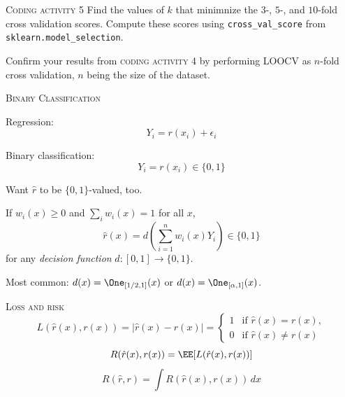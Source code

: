 \documentclass{beamer}
\begin{document}
\begin{frame}{\textsc{Coding activity 5}}
    Find the values of $k$ that minimnize the $3$-, $5$-, and $10$-fold cross validation scores.
    Compute these scores using \texttt{cross\_val\_score} from \texttt{sklearn.model\_selection}.
    
    Confirm your results from \textsc{coding activity 4} by performing LOOCV as 
    $n$-fold cross validation, $n$ being the size of the dataset.
\end{frame}

\begin{frame}{\textsc{Binary Classification}}
    
    Regression:
    \[
        Y_i = r(x_i) + \epsilon_i
    \]
    
    Binary classification:
    \[
        Y_i = r(x_i) \in\{0,1\}
    \]
    
    Want $\hat r$ to be $\{0,1\}$-valued, too.

    If $w_i(x)\geq 0$ and $\sum_i w_i(x)=1$ for all $x$,
    \[
        \hat r(x) = d\left(\sum_{i=1}^nw_i(x)Y_i\right) \in \{0,1\}
    \]
    for any \emph{decision function} $d:[0,1]\to\{0,1\}$.

    Most common: $d(x)=\One_{[1/2, 1]}(x)$ or $d(x) = \One_{[\alpha, 1]}(x)$.
\end{frame}

\begin{frame}{\textsc{Loss and risk}}
    \[
        L(\hat r(x), r(x)) = |\hat r(x) - r(x)| = \begin{cases}
            1&\text{if $\hat r(x) = r(x)$},\\ 0&\text{if $\hat r(x)\neq r(x)$}
        \end{cases}
    \]
    \[
        R(\hat r(x), r(x)) = \EE[L(\hat r(x), r(x))]
    \]
    \[
        R(\hat r, r) = \int R(\hat r(x), r(x))\,dx
    \]
    
\end{frame}
\end{document}

